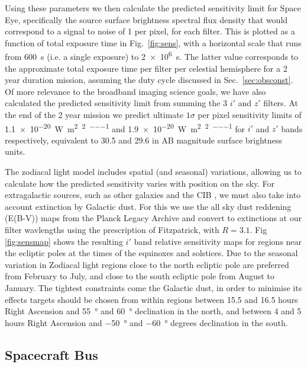\documentclass[]{iac}
\begin{document}
Using these parameters we then calculate the predicted sensitivity limit for Space Eye, specifically the source surface
brightness spectral flux density that would correspond to a signal to noise of 1 per pixel, for each filter. This is
plotted as a function of total exposure time in Fig.~\ref{fig:sens}, with a horizontal scale that runs from
\SI{600}{\second} (i.e. a single exposure) to \SI{2e6}{\second}. The latter value corresponds to the approximate total
exposure time per filter per celestial hemisphere for a 2 year duration mission, assuming the duty cycle discussed in
Sec.~\ref{sec:obsconst}. Of more relevance to the broadband imaging science goals, we have also calculated the predicted
sensitivity limit from summing the 3 $i'$ and $z'$ filters. At the end of the 2 year mission we predict ultimate
$1\sigma$ per pixel sensitivity limits of \SI{1.1e-20}{\watt\per\metre\squared\per\tarcsecond\squared\per\micron} and
\SI{1.9e-20}{\watt\per\metre\squared\per\tarcsecond\squared\per\micron} for $i'$ and $z'$ bands respectively, equivalent
to 30.5 and 29.6 in AB magnitude surface brightness units.

The zodiacal light model includes spatial (and seasonal) variations, allowing us to calculate how the predicted
sensitivity varies with position on the sky. For extragalactic sources, such as other galaxies and the CIB
, we must also take into account extinction by Galactic dust. For this we use the all sky dust reddening
(E(B-V)) maps from the Planck Legacy Archive\cite{Abergel2014} and convert to extinctions at our filter wavlengths using
the prescription of Fitzpatrick\cite{Fitzpatrick1999}, with $R=3.1$.  Fig \ref{fig:sensmap} shows the resulting $i'$
band relative sensitivity maps for regions near the ecliptic poles at the times of the equinoxes and solstices. Due to
the seasonal variation in Zodiacal light regions close to the north ecliptic pole are preferred from February to July,
and close to the south ecliptic pole from August to January. The tightest constraints come the Galactic dust, in order
to minimise its effects targets should be chosen from within regions between 15.5 and 16.5 hours Right Ascension and
\SI{+55}{\degree} and \SI{+60}{\degree} declination in the north, and between 4 and 5 hours Right Ascension and
\SI{-50}{\degree} and \SI{-60}{\degree} degrees declination
in the south.

\subsection{Spacecraft Bus}
\end{document}
